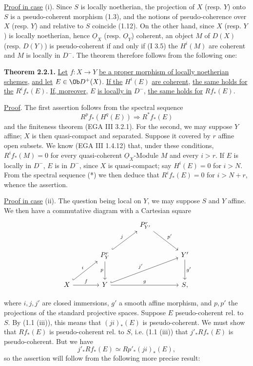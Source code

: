 \uline{Proof in case} (i). Since \(S\) is locally noetherian, the projection of \(X\) (resp. \(Y\)) onto \(S\) is a pseudo-coherent morphism (1.3), and the notions of pseudo-coherence over \(X\) (resp. \(Y\)) and relative to \(S\) coincide (1.12). On the other hand, since \(X\) (resp. \(Y\)) is locally noetherian, hence \(\underline{O}_X\) (resp. \(\underline{O}_Y\)) coherent, an object \(M\) of \(D(X)\) (resp. \(D(Y)\)) is pseudo-coherent if and only if (I 3.5) the \(H^i(M)\) are coherent and \(M\) is locally in \(D^{-}\). The theorem therefore follows from the following one:

\textbf{Theorem 2.2.1.} \uline{Let} \(f:X\to Y\) \uline{be a proper morphism of locally noetherian schemes}, \uline{and let} \(E\in\Ob D^+(X)\). \uline{If the} \(H^i(E)\) \uline{are coherent}, \uline{the same holds for the} \(R^if_*(E)\). \uline{If, moreover,} \(E\) \uline{is locally in} \(D^{-}\), \uline{the same holds for} \(Rf_*(E)\).

\uline{Proof}. The first assertion follows from the spectral sequence
\begin{equation}\tag{$*$}
  R^pf_*(H^q(E)) \Longrightarrow R^*f_*(E)
\end{equation}
and the finiteness theorem (EGA III 3.2.1). For the second, we may suppose \(Y\) affine; \(X\) is then quasi-compact and separated. Suppose it covered by \(r\) affine open subsets. We know (EGA III 1.4.12) that, under these conditions, \(R^if_*(M)=0\) for every quasi-coherent \(\underline{O}_X\)-Module \(M\) and every \(i>r\). If \(E\) is locally in \(D^{-}\), \(E\) is in \(D^{-}\), since \(X\) is quasi-compact; say \(H^i(E)=0\) for \(i>N\). From the spectral sequence (*) we then deduce that \(R^if_*(E)=0\) for \(i>N+r\), whence the assertion.

\uline{Proof in case} (ii). The question being local on \(Y\), we may suppose \(S\) and \(Y\) affine. We then have a commutative diagram with a Cartesian square
\[
\begin{tikzcd}[column sep=large,row sep=large]
& & P^r_{Y'} \arrow[dr,"p'"] & \\
& P^r_Y \arrow[ur,hook,"j"] \arrow[d,"p"'] & & Y' \arrow[d,"g'"]\\
X \arrow[ur,hook,"i"] \arrow[r,"f"] & Y \arrow[urr,hook,"j'"] \arrow[rr,"g"] & & S{,}
\end{tikzcd}
\]

where \(i,j,j'\) are closed immersions, \(g'\) a smooth affine morphism, and \(p,p'\) the projections of the standard projective spaces. Suppose \(E\) pseudo-coherent rel. to \(S\). By (1.1 (iii)), this means that \((ji)_*(E)\) is pseudo-coherent. We must show that \(Rf_*(E)\) is pseudo-coherent rel. to \(S\), i.e. (1.1 (iii)) that \(j'_*Rf_*(E)\) is pseudo-coherent. But we have
\[
  j'_*Rf_*(E)\simeq Rp'_*(ji)_*(E),
\]
so the assertion will follow from the following more precise result:

